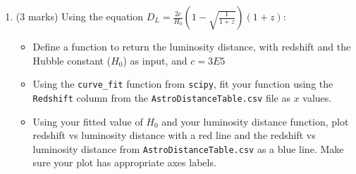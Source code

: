 \begin{enumerate}
    \item (3 marks) Using the equation $D_L = \frac{2c}{H_0} \left( 1-\sqrt{\frac{1}{1+z}} \right )(1+z)$:
    \begin{itemize}
        \item Define a function to return the luminosity distance, with redshift and the Hubble constant ($H_0$) as input, and $c=3E5$
        \item Using the {\tt curve\_fit} function from {\tt scipy}, fit your function using the { \tt Redshift} column from the {\tt AstroDistanceTable.csv} file as $x$ values.
        \item Using your fitted value of $H_0$ and your luminosity distance function, plot redshift vs luminosity distance with a red line and the redshift vs luminosity distance from  {\tt AstroDistanceTable.csv} as a blue line. Make sure your plot has appropriate axes labels.
    \end{itemize}
    
    
\end{enumerate}
